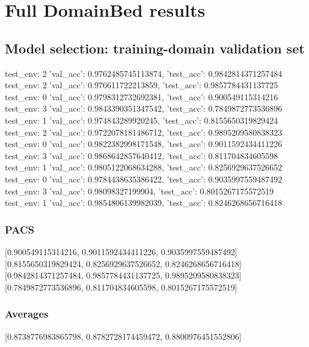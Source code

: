 \documentclass{article}
\begin{document}
\section{Full DomainBed results}

\subsection{Model selection: training-domain validation set}
test_env: 2
{'val_acc': 0.9762485745113874, 'test_acc': 0.9842814371257484}
test_env: 2
{'val_acc': 0.976611722213859, 'test_acc': 0.9857784431137725}
test_env: 0
{'val_acc': 0.9798312732692381, 'test_acc': 0.900549115314216}
test_env: 3
{'val_acc': 0.9843390351347542, 'test_acc': 0.7849872773536896}
test_env: 1
{'val_acc': 0.974843289920245, 'test_acc': 0.8155650319829424}
test_env: 2
{'val_acc': 0.9722078181486712, 'test_acc': 0.9895209580838323}
test_env: 0
{'val_acc': 0.9822382998171548, 'test_acc': 0.9011592434411226}
test_env: 3
{'val_acc': 0.9868642857640412, 'test_acc': 0.811704834605598}
test_env: 1
{'val_acc': 0.9805122068634288, 'test_acc': 0.8256929637526652}
test_env: 0
{'val_acc': 0.9784438635386422, 'test_acc': 0.9035997559487492}
test_env: 3
{'val_acc': 0.98098327199904, 'test_acc': 0.8015267175572519}
test_env: 1
{'val_acc': 0.9854806139982039, 'test_acc': 0.8246268656716418}

\subsubsection{PACS}
[0.900549115314216, 0.9011592434411226, 0.9035997559487492]
[0.8155650319829424, 0.8256929637526652, 0.8246268656716418]
[0.9842814371257484, 0.9857784431137725, 0.9895209580838323]
[0.7849872773536896, 0.811704834605598, 0.8015267175572519]

\begin{center}
\end{center}

\subsubsection{Averages}
[0.8738776983865798, 0.8782728174459472, 0.8800976451552806]

\begin{center}
\end{center}
\end{document}
